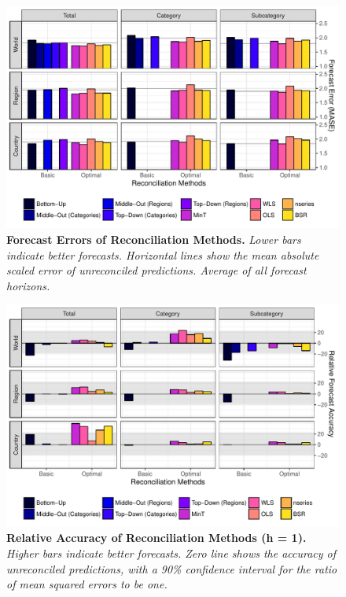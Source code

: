\begin{figure}[H]
	\includegraphics[width=\textwidth]{fig/fig_eval_mase}
	\caption[Forecast Errors of Reconciliation Methods]{\textbf{Forecast Errors of Reconciliation Methods.} \textit{Lower bars indicate better forecasts. Horizontal lines show the mean absolute scaled error of unreconciled predictions. Average of all forecast horizons.}}\label{fig:mase}
\end{figure}
\begin{figure}[H]
	\includegraphics[width=\textwidth]{fig/fig_eval_rmse_relative_h1}
	\caption[Relative Accuracy of Reconciliation Methods (h = 1)]{\textbf{Relative Accuracy of Reconciliation Methods (h = 1).} \textit{Higher bars indicate better forecasts. Zero line shows the accuracy of unreconciled predictions, with a 90\% confidence interval for the ratio of mean squared errors to be one.}} \label{fig:rmseh1}
\end{figure}

